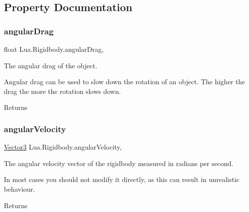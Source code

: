 \subsection{Property Documentation}
\mbox{\label{class_lua_1_1_rigidbody_a901b3213408100236b17a3e55b64e6f7}} 
\subsubsection{\texorpdfstring{angularDrag}{angularDrag}}
{\footnotesize\ttfamily float Lua.\+Rigidbody.\+angular\+Drag\hspace{0.3cm}{\ttfamily [get]}, {\ttfamily [set]}}



The angular drag of the object. 

Angular drag can be used to slow down the rotation of an object. The higher the drag the more the rotation slows down. \begin{DoxyReturn}{Returns}

\end{DoxyReturn}
\mbox{\label{class_lua_1_1_rigidbody_ab88493ae1a778194017c0e3a87c0625d}} 
\subsubsection{\texorpdfstring{angularVelocity}{angularVelocity}}
{\footnotesize\ttfamily \mbox{\hyperlink{class_lua_1_1_vector3}{Vector3}} Lua.\+Rigidbody.\+angular\+Velocity\hspace{0.3cm}{\ttfamily [get]}, {\ttfamily [set]}}



The angular velocity vector of the rigidbody measured in radians per second. 

In most cases you should not modify it directly, as this can result in unrealistic behaviour. \begin{DoxyReturn}{Returns}

\end{DoxyReturn}
\mbox{\label{class_lua_1_1_rigidbody_ac537e281d009b3e07c93f7357fa743cd}} 
